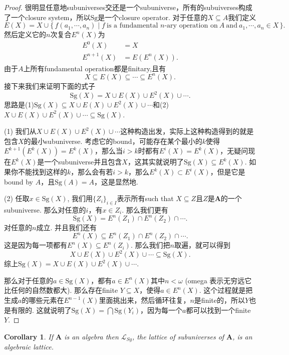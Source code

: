 \documentclass{article}
\newtheorem{corollary}[theorem]{Corollary}
\newcommand\Set[2]{\{\,#1\mid#2\,\}} %
\newcommand\Sg{\text{Sg}}
\begin{document}
\begin{proof}
很明显任意地subuniverses交还是一个subuniverse，所有的subuiverses构成了一个closure system，所以$\Sg$是一个closure operator. 对于任意的$X \subseteq A$我们定义
$$
E(X) = X \cup \Set{f(a_1,\cdots,a_n)}{f\ \text{is a fundamental $n$-ary operation on}\ A\ \text{and}\ a_1,\cdots,a_n \in X}. 
$$
然后定义它的$n$次复合$E^n(X)$为
$$
\begin{aligned}
E^0(X) &= X \\
E^{n+1}(X) &= E(E^n(X)).
\end{aligned}
$$
由于$A$上所有fundamental operation都是finitary,且有
$$
X \subseteq E(X) \subseteq \cdots \subseteq E^n(X).
$$
接下来我们来证明下面的式子
$$
\Sg(X) = X \cup E(X) \cup E^2(X) \cup \cdots.
$$
思路是(1)$\Sg(X) \subseteq X \cup E(X) \cup E^2(X) \cup \cdots$和(2)$X \cup E(X) \cup E^2(X) \cup \cdots \subseteq \Sg(X)$. 

(1) 我们从$X \cup E(X) \cup E^2(X) \cup \cdots$这种构造出发，实际上这种构造得到的就是包含$X$的最小subuniverse. 考虑它的bound，可能存在某个最小的$k$使得$E^{k+1}(E^k(X)) = E^k(X)$，那么当$i > k$时都有$E^i(X) = E^k(X)$，无疑问现在$E^k(X)$是一个subuniverse并且包含$X$，这其实就说明了$\Sg(X) \subseteq E^k(X)$. 如果你不能找到这样的$k$，那么会有若$i>k$，那么$E^k(X) \subset E^i(X)$，但是它是bound by $A$，且$\Sg(A) = A$，这是显然地.

(2) 任取$x \in \Sg(X)$, 我们用$\{Z_i\}_{i \in I}$表示所有such that $X \subseteq Z$且$Z$是$\mathbf{A}$的一个subuniverse. 那么对任意的$i$，有$x \in Z_i$. 那么我们更有
$$
\Sg(X) = E^n(Z_1) \cap E^n(Z_2) \cap \cdots.
$$
对任意的$n$成立. 并且我们还有
$$
E^n(X) \subseteq E^n(Z_1) \cap E^n(Z_2) \cap \cdots.
$$
这是因为每一项都有$E^n(X) \subseteq E^n(Z_i)$. 那么我们把$n$取遍，就可以得到
$$
X \cup E(X) \cup E^2(X) \cup \cdots \subseteq \Sg(X).
$$
综上$\Sg(X) = X \cup E(X) \cup E^2(X) \cup \cdots.$

那么对于任意的$a \in \Sg(X)$，都有$a \in E^n(X)$其中$n < \omega$ (omega 表示无穷远它比任何的自然数都大). 那么存在finite $Y \subseteq X$，使得$a \in E^n(X)$. 这个过程就是把生成$a$的哪些元素在$E^{n-1}(X)$里面挑出来，然后循环往复，$n$是finite的，所以$Y$也是有限的. 这就说明了$\Sg(X) = \bigcap \Sg(Y_i)$，因为每一个$a$都可以找到一个finite $Y$.
\end{proof}

\begin{corollary}
If $\mathbf{A}$ is an algebra then $\mathcal{L}_{Sg}$, the lattice of subuniverses of $\mathbf{A}$, is an algebraic lattice.
\end{corollary}
\end{document}
